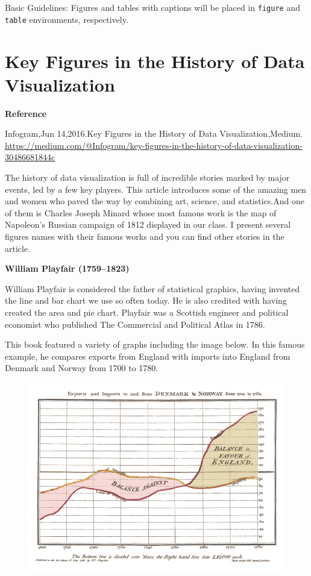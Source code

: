 \documentclass[]{book}
\theoremstyle{definition}
\theoremstyle{definition}
\theoremstyle{definition}
\theoremstyle{remark}
\begin{document}
Basic Guidelines: Figures and tables with captions will be placed in
\texttt{figure} and \texttt{table} environments, respectively.

\section{Key Figures in the History of Data
Visualization}\label{key-figures-in-the-history-of-data-visualization}

\textbf{Reference}

Infogram,Jun 14,2016.Key Figures in the History of Data
Visualization,Medium.
\url{https://medium.com/@Infogram/key-figures-in-the-history-of-data-visualization-30486681844c}

The history of data visualization is full of incredible stories marked
by major events, led by a few key players. This article introduces some
of the amazing men and women who paved the way by combining art,
science, and statistics.And one of them is Charles Joseph Minard whose
most famous work is the map of Napoleon's Russian campaign of 1812
displayed in our class. I present several figures names with their
famous works and you can find other stories in the article.

\textbf{William Playfair (1759--1823)}

William Playfair is considered the father of statistical graphics,
having invented the line and bar chart we use so often today. He is also
credited with having created the area and pie chart. Playfair was a
Scottish engineer and political economist who published The Commercial
and Political Atlas in 1786.

This book featured a variety of graphs including the image below. In
this famous example, he compares exports from England with imports into
England from Denmark and Norway from 1700 to 1780.

\begin{figure}
\centering
\includegraphics{images/Playfair.png}
\caption{}
\end{figure}
\end{document}
